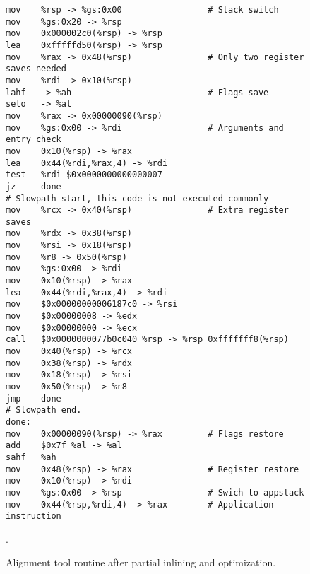 \begin{figure}
\begin{verbatim}
mov    %rsp -> %gs:0x00                 # Stack switch
mov    %gs:0x20 -> %rsp
mov    0x000002c0(%rsp) -> %rsp
lea    0xfffffd50(%rsp) -> %rsp
mov    %rax -> 0x48(%rsp)               # Only two register saves needed
mov    %rdi -> 0x10(%rsp)
lahf   -> %ah                           # Flags save
seto   -> %al
mov    %rax -> 0x00000090(%rsp)
mov    %gs:0x00 -> %rdi                 # Arguments and entry check
mov    0x10(%rsp) -> %rax
lea    0x44(%rdi,%rax,4) -> %rdi
test   %rdi $0x0000000000000007
jz     done
# Slowpath start, this code is not executed commonly
mov    %rcx -> 0x40(%rsp)               # Extra register saves
mov    %rdx -> 0x38(%rsp)
mov    %rsi -> 0x18(%rsp)
mov    %r8 -> 0x50(%rsp)
mov    %gs:0x00 -> %rdi
mov    0x10(%rsp) -> %rax
lea    0x44(%rdi,%rax,4) -> %rdi
mov    $0x00000000006187c0 -> %rsi
mov    $0x00000008 -> %edx
mov    $0x00000000 -> %ecx
call   $0x0000000077b0c040 %rsp -> %rsp 0xfffffff8(%rsp)
mov    0x40(%rsp) -> %rcx
mov    0x38(%rsp) -> %rdx
mov    0x18(%rsp) -> %rsi
mov    0x50(%rsp) -> %r8
jmp    done
# Slowpath end.
done:
mov    0x00000090(%rsp) -> %rax         # Flags restore
add    $0x7f %al -> %al
sahf   %ah
mov    0x48(%rsp) -> %rax               # Register restore
mov    0x10(%rsp) -> %rdi
mov    %gs:0x00 -> %rsp                 # Swich to appstack
mov    0x44(%rsp,%rdi,4) -> %rax        # Application instruction
\end{verbatim}
\caption{Alignment tool routine after partial inlining and optimization.}
\label{fig:alignment_all_opt}.
\end{figure}
